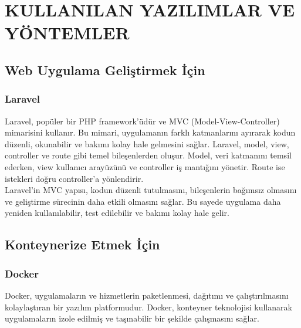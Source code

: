 \section{KULLANILAN YAZILIMLAR VE YÖNTEMLER}

\subsection{Web Uygulama Geliştirmek İçin}
\subsubsection{Laravel }
Laravel, popüler bir PHP framework'üdür ve MVC (Model-View-Controller) mimarisini kullanır. Bu mimari, uygulamanın farklı katmanlarını ayırarak kodun düzenli, okunabilir ve bakımı kolay hale gelmesini sağlar. Laravel, model, view, controller ve route gibi temel bileşenlerden oluşur. Model, veri katmanını temsil ederken, view kullanıcı arayüzünü ve controller iş mantığını yönetir. Route ise istekleri doğru controller'a yönlendirir.\\

Laravel'in MVC yapısı, kodun düzenli tutulmasını, bileşenlerin bağımsız olmasını ve geliştirme sürecinin daha etkili olmasını sağlar. Bu sayede uygulama daha yeniden kullanılabilir, test edilebilir ve bakımı kolay hale gelir.

\subsection{Konteynerize Etmek İçin  }
\subsubsection{Docker}
Docker, uygulamaların ve hizmetlerin paketlenmesi, dağıtımı ve çalıştırılmasını kolaylaştıran bir yazılım platformudur. Docker, konteyner teknolojisi kullanarak uygulamaların izole edilmiş ve taşınabilir bir şekilde çalışmasını sağlar.

